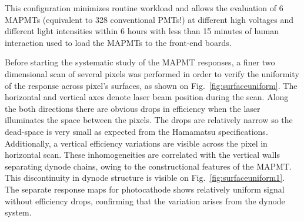 This configuration minimizes routine workload and allows the evaluation of 6 MAPMTs (equivalent to 328 conventional PMTs!) at different high voltages and different light intensities within 6 hours with less than 15 minutes of human interaction used to load the MAPMTs to the front-end boards.


Before starting the systematic study of the MAPMT responses, a finer two dimensional scan of several pixels was performed in order to verify the uniformity of the response across pixel's surfaces, as shown on Fig.~\ref{fig:surfaceuniform}.
The horizontal and vertical axes denote laser beam position during the scan.
Along the both directions there are obvious drops in efficiency when the laser illuminates the space between the pixels.
The drops are relatively narrow so the dead-space is very small as expected from the Hamamatsu specifications.
Additionally, a vertical efficiency variations are visible across the pixel in horizontal scan.
These inhomogeneities are correlated with the vertical walls separating dynode chains, owing to the constructional features of the MAPMT.
This discontinuity in dynode structure is visible on Fig.~\ref{fig:surfaceuniform1}.
The separate response maps for photocathode shows relatively uniform signal without efficiency drops, confirming that the variation arises from the dynode system.

